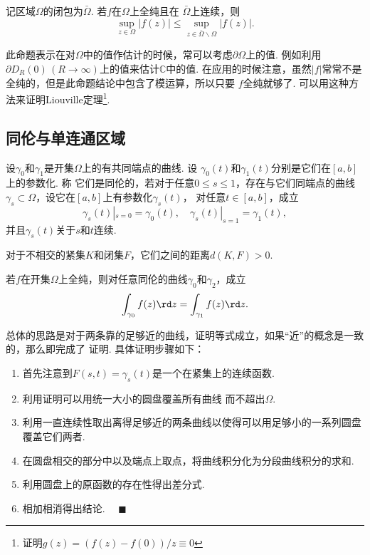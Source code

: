  \begin{cor}
    记区域$\Omega$的闭包为$\bar{\Omega}$. 若$f$在$\Omega$上全纯且在
    $\bar{\Omega}$上连续，则
    \[
      \sup_{z\in\Omega}|f(z)| \le \sup_{z\in\bar{\Omega}\backslash\Omega}|f(z)|.
    \]
  \end{cor}
  \remark
    此命题表示在对$\Omega$中的值作估计的时候，常可以考虑$\partial\Omega$上的值.
    例如利用$\partial D_R(0)\,(R\to\infty)$上的值来估计$\mathbb{C}$中的值. 
    在应用的时候注意，虽然$|f|$常常不是全纯的，但是此命题结论中包含了模运算，所以只要
    $f$全纯就够了.
    可以用这种方法来证明Liouville定理\footnote{证明$g(z)=(f(z)-f(0))/z\equiv 0$}. 


\subsection{同伦与单连通区域}

  \begin{defi}[同伦]
    设$\gamma_0$和$\gamma_1$是开集$\Omega$上的有共同端点的曲线. 设
    $\gamma_0(t)$和$\gamma_1(t)$分别是它们在$[a,b]$上的参数化. 称
    它们是同伦的，若对于任意$0\le s\le 1$，存在与它们同端点的曲线
    $\gamma_s\subset\Omega$，设它在$[a,b]$上有参数化$\gamma_s(t)$，
    对任意$t\in [a,b]$，成立
    \[
      \gamma_s(t)|_{s=0} = \gamma_0(t),\quad 
      \gamma_s(t)|_{s=1} = \gamma_1(t),
    \]
    并且$\gamma_s(t)$关于$s$和$t$连续.
  \end{defi}

  \begin{lemma}
    \label{lemma: 紧集、闭集、距离}
    对于不相交的紧集$K$和闭集$F$，它们之间的距离$d(K, F)>0$.
  \end{lemma}

  \begin{thm}
    若$f$在开集$\Omega$上全纯，则对任意同伦的曲线$\gamma_0$和$\gamma_2$，成立
    \[
      \int_{\gamma_0}f(z)\rd z = \int_{\gamma_1}f(z)\rd z.
    \]
  \end{thm}
  \proof
    总体的思路是对于两条靠的足够近的曲线，证明等式成立，如果“近”的概念是一致的，那么即完成了
    证明. 具体证明步骤如下：
    \begin{enumerate}
      \item 首先注意到$F(s, t)=\gamma_s(t)$是一个在紧集上的连续函数.
      \item 利用证明可以用统一大小的圆盘覆盖所有曲线
        而不超出$\Omega$.
      \item 利用一直连续性取出离得足够近的两条曲线以使得可以用足够小的一系列圆盘覆盖它们两者.
      \item 在圆盘相交的部分中以及端点上取点，将曲线积分化为分段曲线积分的求和.
      \item 利用圆盘上的原函数的存在性得出差分式.
      \item 相加相消得出结论. $\quad\blacksquare$
    \end{enumerate}

